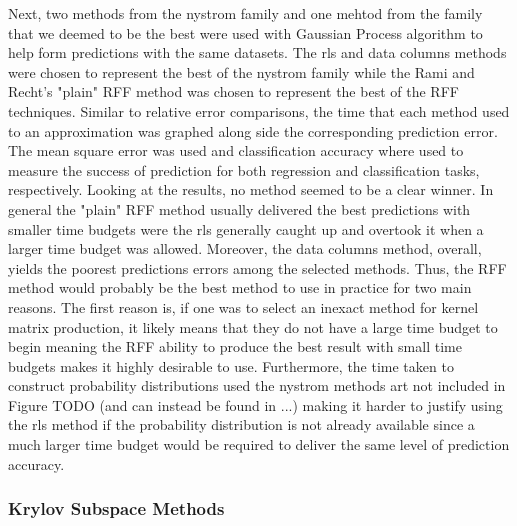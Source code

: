 Next, two methods from the nystrom family and one mehtod from the family that we deemed to be the best were used with Gaussian Process algorithm to help form predictions with the same datasets. The rls and data columns methods were chosen to represent the best of the nystrom family while the Rami and Recht's "plain" RFF method was chosen to represent the best of the RFF techniques. Similar to relative error comparisons, the time that each method used to an approximation was graphed along side the corresponding prediction error. The mean square error was used and classification accuracy where used to measure the success of prediction for both regression and classification tasks, respectively. Looking at the results, no method seemed to be a clear winner. In general the "plain" RFF method usually delivered the best predictions with smaller time budgets were the rls generally caught up and overtook it when a larger time budget was allowed. Moreover, the data columns method, overall, yields the poorest predictions errors among the selected methods. Thus, the RFF method would probably be the best method to use in practice for two main reasons. The first reason is, if one was to select an inexact method for kernel matrix production, it likely means that they do not have a large time budget to begin meaning the RFF ability to produce the best result with small time budgets makes it highly desirable to use. Furthermore, the time taken to construct probability distributions used the nystrom methods art not included in Figure TODO (and can instead be found in ...) making it harder to justify using the rls method if the probability distribution is not already available since a much larger time budget would be required to deliver the same level of prediction accuracy.

\subsubsection{Krylov Subspace Methods}\label{Section5.3.2}

